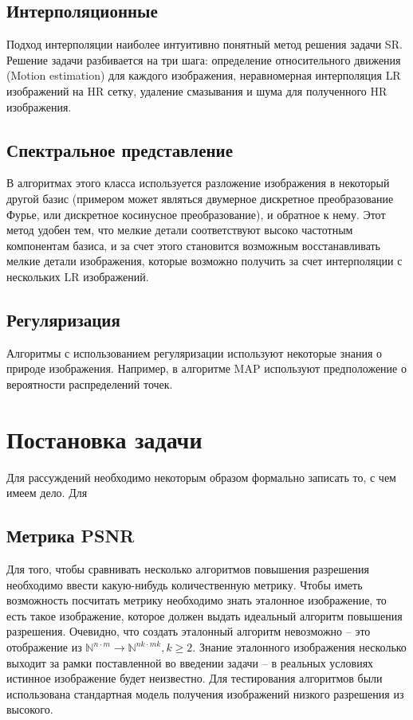\subsection{Интерполяционные}
Подход интерполяции наиболее интуитивно понятный метод решения задачи SR. Решение задачи
разбивается на три шага: определение относительного движения (Motion estimation) для каждого изображения, неравномерная
интерполяция LR изображений на HR сетку, удаление смазывания и шума для полученного HR изображения.

\subsection{Спектральное представление}
В алгоритмах этого класса используется разложение изображения в некоторый другой
базис (примером может являться двумерное дискретное преобразование Фурье, или дискретное косинусное преобразование), и
обратное к нему.  Этот метод удобен тем, что мелкие детали соответствуют высоко частотным компонентам базиса, и за счет
этого становится возможным восстанавливать мелкие детали изображения, которые возможно получить за счет интерполяции с
нескольких LR изображений.

\subsection{Регуляризация} Алгоритмы с использованием регуляризации используют некоторые знания о природе изображения.
Например, в алгоритме MAP используют предположение о вероятности распределений точек.

\section{Постановка задачи}
Для рассуждений необходимо некоторым образом формально записать то, с чем имеем дело. Для

\subsection{Метрика PSNR}
Для того, чтобы сравнивать несколько алгоритмов повышения разрешения необходимо ввести какую-нибудь количественную
метрику. Чтобы иметь возможность посчитать метрику необходимо знать эталонное изображение, то есть такое изображение,
которое должен выдать идеальный алгоритм повышения разрешения. Очевидно, что создать эталонный алгоритм невозможно --
это отображение из $\mathbb{N}^{n \cdot m } \to \mathbb{N}^{nk \cdot mk}, k \ge 2$. Знание эталонного изображения
несколько выходит за рамки поставленной во введении задачи -- в реальных условиях истинное изображение будет неизвестно.
Для тестирования алгоритмов были использована стандартная модель получения изображений низкого разрешения из высокого.

